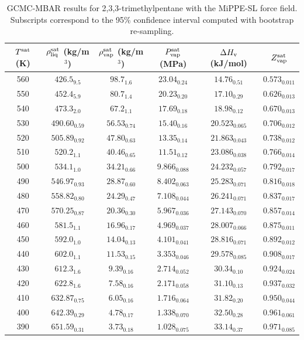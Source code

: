 \documentclass[journal=jctc,manuscript=article]{achemso}
\begin{document}
\begin{table}[htb!]
	\caption{GCMC-MBAR results for 2,3,3-trimethylpentane with the MiPPE-SL force field. Subscripts correspond to the 95\% confidence interval computed with bootstrap re-sampling.}
	\begin{center}
		\begin{tabular}{|c|c|c|c|c|c|}
			\hline
			$T^{\rm sat}$ (K) & $\rho_{\rm liq}^{\rm sat}$ (kg/m$^3$) & $\rho_{\rm vap}^{\rm sat}$ (kg/m$^3$) & $P_{\rm vap}^{\rm sat}$ (MPa) & $\Delta H_{\rm v}$ (kJ/mol) & $Z_{\rm vap}^{\rm sat}$ \\ \hline
			560 & $426.5_{9.5}$ & $98.7_{1.6}$ & $23.04_{0.24}$ & $14.76_{0.51}$ & $0.573_{0.011}$ \\
			550 & $452.4_{5.9}$ & $80.7_{1.4}$ & $20.23_{0.20}$ & $17.10_{0.29}$ & $0.626_{0.013}$ \\
			540 & $473.3_{2.0}$ & $67.2_{1.1}$ & $17.69_{0.18}$ & $18.98_{0.12}$ & $0.670_{0.013}$ \\
			530 & $490.60_{0.59}$ & $56.53_{0.74}$ & $15.40_{0.16}$ & $20.523_{0.065}$ & $0.706_{0.012}$ \\
			520 & $505.89_{0.92}$ & $47.80_{0.63}$ & $13.35_{0.14}$ & $21.863_{0.043}$ & $0.738_{0.012}$ \\
			510 & $520.2_{1.1}$ & $40.46_{0.65}$ & $11.51_{0.12}$ & $23.086_{0.038}$ & $0.766_{0.014}$ \\
			500 & $534.1_{1.0}$ & $34.21_{0.66}$ & $9.866_{0.088}$ & $24.232_{0.057}$ & $0.792_{0.017}$ \\
			490 & $546.97_{0.93}$ & $28.87_{0.60}$ & $8.402_{0.063}$ & $25.283_{0.071}$ & $0.816_{0.018}$ \\
			480 & $558.82_{0.80}$ & $24.29_{0.47}$ & $7.108_{0.044}$ & $26.241_{0.071}$ & $0.837_{0.017}$ \\
			470 & $570.25_{0.87}$ & $20.36_{0.30}$ & $5.967_{0.036}$ & $27.143_{0.070}$ & $0.857_{0.014}$ \\
			460 & $581.5_{1.1}$ & $16.96_{0.17}$ & $4.969_{0.037}$ & $28.007_{0.066}$ & $0.875_{0.011}$ \\
			450 & $592.0_{1.0}$ & $14.04_{0.13}$ & $4.101_{0.041}$ & $28.816_{0.071}$ & $0.892_{0.012}$ \\
			440 & $602.0_{1.1}$ & $11.53_{0.15}$ & $3.353_{0.046}$ & $29.578_{0.085}$ & $0.908_{0.017}$ \\
			430 & $612.3_{1.6}$ & $9.39_{0.16}$ & $2.714_{0.052}$ & $30.34_{0.10}$ & $0.924_{0.024}$ \\
			420 & $622.8_{1.6}$ & $7.58_{0.16}$ & $2.171_{0.058}$ & $31.10_{0.13}$ & $0.937_{0.032}$ \\
			410 & $632.87_{0.75}$ & $6.05_{0.16}$ & $1.716_{0.064}$ & $31.82_{0.20}$ & $0.950_{0.044}$ \\
			400 & $642.39_{0.29}$ & $4.78_{0.17}$ & $1.338_{0.070}$ & $32.50_{0.28}$ & $0.961_{0.061}$ \\
			390 & $651.59_{0.31}$ & $3.73_{0.18}$ & $1.028_{0.075}$ & $33.14_{0.37}$ & $0.971_{0.085}$ \\
			\hline
		\end{tabular}
	\end{center}
\end{table}
\end{document}
